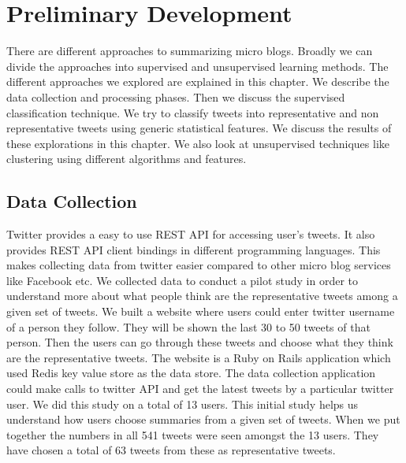 \chapter{Preliminary Development}
\label{chap-three}

There are different approaches to summarizing micro blogs. Broadly we can divide the approaches into supervised and unsupervised learning methods. The different approaches we explored are explained in this chapter. We describe the data collection and processing phases. Then we discuss the supervised classification technique. We try to classify tweets into representative and non representative tweets using generic statistical features. We discuss the results of these explorations in this chapter. We also look at unsupervised techniques like clustering using different algorithms and features.

\section{Data Collection}
Twitter provides a easy to use REST API for accessing user’s tweets. It also provides REST API client bindings in different programming languages. This makes collecting data from twitter easier compared to other micro blog services like Facebook etc. We collected data to conduct a pilot study in order to understand more about what people think are the representative tweets among a given set of tweets. We built a website where users could enter twitter username of a person they follow. They will be shown the last 30 to 50 tweets of that person. Then the users can go through these tweets and choose what they think are the representative tweets. The website is a Ruby on Rails application which used Redis key value store as the data store. The data collection application could make calls to twitter API and get the latest tweets by a particular twitter user. We did this study on a total of 13 users. This initial study helps us understand how users choose summaries from a given set of tweets. When we put together the numbers in all 541 tweets were seen amongst the 13 users. They have chosen a total of 63 tweets from these as representative tweets.

